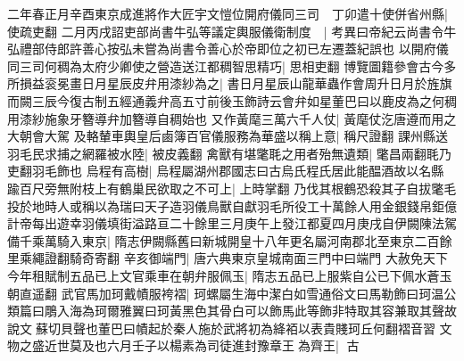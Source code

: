 二年春正月辛酉東京成進將作大匠宇文愷位開府儀同三司　丁卯遣十使併省州縣|{
	使疏吏翻}
二月丙戌詔吏部尚書牛弘等議定輿服儀衛制度　|{
	考異曰帝紀云尚書令牛弘禮部侍郎許善心按弘未嘗為尚書令善心於帝即位之初已左遷蓋紀誤也}
以開府儀同三司何稠為太府少卿使之營造送江都稠智思精巧|{
	思相吏翻}
博覽圖籍參會古今多所損益衮冕畫日月星辰皮弁用漆紗為之|{
	書日月星辰山龍華蟲作會周升日月於旌旗而闕三辰今復古制五經通義弁高五寸前後玉飾詩云會弁如星董巴曰以鹿皮為之何稠用漆紗施象牙簪導弁加簪導自稠始也}
又作黃麾三萬六千人仗|{
	黃麾仗汔唐遵而用之大朝會大駕}
及輅輦車輿皇后鹵簿百官儀服務為華盛以稱上意|{
	稱尺證翻}
課州縣送羽毛民求捕之網羅被水陸|{
	被皮義翻}
禽獸有堪氅毦之用者殆無遺類|{
	氅昌兩翻毦乃吏翻羽毛飾也}
烏程有高樹|{
	烏程屬湖州郡國志曰古烏氏程氏居此能醖酒故以名縣}
踰百尺旁無附枝上有鶴巢民欲取之不可上|{
	上時掌翻}
乃伐其根鶴恐殺其子自拔氅毛投於地時人或稱以為瑞曰天子造羽儀鳥獸自獻羽毛所役工十萬餘人用金銀錢帛鉅億計帝每出遊幸羽儀填街溢路亘二十餘里三月庚午上發江都夏四月庚戌自伊闕陳法駕備千乘萬騎入東京|{
	隋志伊闕縣舊曰新城開皇十八年更名屬河南郡北至東京二百餘里乘繩證翻騎奇寄翻}
辛亥御端門|{
	唐六典東京皇城南面三門中曰端門}
大赦免天下今年租賦制五品已上文官乘車在朝弁服佩玉|{
	隋志五品已上服紫自公已下佩水蒼玉朝直遥翻}
武官馬加珂戴幘服袴褶|{
	珂螺屬生海中潔白如雪通俗文曰馬勒飾曰珂温公類篇曰鵰入海為珂爾雅翼曰珂黃黑色其骨白可以飾馬此等飾非特取其容兼取其聲故說文蘇切貝聲也董巴曰幘起於秦人施於武將初為絳袹以表貴賤珂丘何翻褶音習}
文物之盛近世莫及也六月壬子以楊素為司徒進封豫章王為齊王|{
	古}


